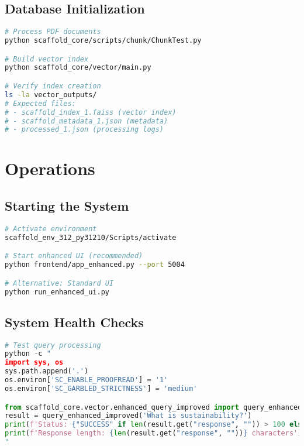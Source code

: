 \documentclass[12pt,a4paper]{article}
\begin{document}
\subsection{Database Initialization}
\begin{lstlisting}[language=bash, caption=Vector database setup]
# Process PDF documents
python scaffold_core/scripts/chunk/ChunkTest.py

# Build vector index
python scaffold_core/vector/main.py

# Verify index creation
ls -la vector_outputs/
# Expected files:
# - scaffold_index_1.faiss (vector index)
# - scaffold_metadata_1.json (metadata)
# - processed_1.json (processing logs)
\end{lstlisting}

\section{Operations}

\subsection{Starting the System}
\begin{lstlisting}[language=bash, caption=System startup]
# Activate environment
scaffold_env_312_py31210/Scripts/activate

# Start enhanced UI (recommended)
python frontend/app_enhanced.py --port 5004

# Alternative: Standard UI
python run_enhanced_ui.py
\end{lstlisting}

\subsection{System Health Checks}
\begin{lstlisting}[language=python, caption=Health check script]
# Test query processing
python -c "
import sys, os
sys.path.append('.')
os.environ['SC_ENABLE_PROOFREAD'] = '1'
os.environ['SC_GARBLED_STRICTNESS'] = 'medium'

from scaffold_core.vector.enhanced_query_improved import query_enhanced_improved
result = query_enhanced_improved('What is sustainability?')
print(f'Status: {"SUCCESS" if len(result.get("response", "")) > 100 else "FAIL"}')
print(f'Response length: {len(result.get("response", ""))} characters')
"
\end{lstlisting}
\end{document}
